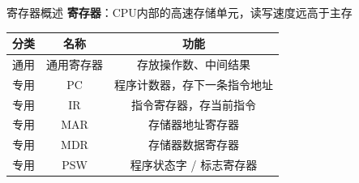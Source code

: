 \documentclass[10pt, aspectratio=169]{beamer}
\begin{document}
\begin{frame}{寄存器概述}
    \textbf{寄存器}：CPU内部的高速存储单元，读写速度远高于主存
    \vspace{0.3em}
    \begin{center}
        \begin{tabular}{|c|c|c|}
            \hline
            \textbf{分类} & \textbf{名称} & \textbf{功能} \\
            \hline
            通用 & 通用寄存器 & 存放操作数、中间结果 \\
            专用 & PC & 程序计数器，存下一条指令地址 \\
            专用 & IR & 指令寄存器，存当前指令 \\
            专用 & MAR & 存储器地址寄存器 \\
            专用 & MDR & 存储器数据寄存器 \\
            专用 & PSW & 程序状态字 / 标志寄存器 \\
            \hline
        \end{tabular}
    \end{center}
\end{frame}
\end{document}

